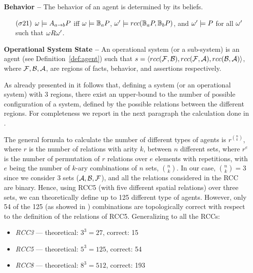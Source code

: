 \begin{definition}{\bf Behavior -- }\label{def:behavior}
	The behavior of an agent is determined by its beliefs. 
	\begin{enumerate}[noitemsep]
		\item[$(\sigma21)$] $\omega\models A_{a\rightarrow b}P$ iff
			$\omega\models\mathbb{B}_{a}{P}$, 
			$\omega'\models rcc(\mathbb{B}_{a}{P},\mathbb{B}_{b}{P})$, and $\omega'\models P$ for all
			$\omega'$ such that $\omega R\omega'$.
	\end{enumerate}
\end{definition}

\begin{definition}{\bf Operational System State --}\label{def:system}
	An operational system (or a sub-system) is an agent (see Definition~\ref{def:agent})
	such that
	$s=\langle rcc(\mathcal{F},\mathcal{B}),rcc(\mathcal{F},\mathcal{A}),rcc(\mathcal{B},\mathcal{A})\rangle$,
	where $\mathcal{F},\mathcal{B},\mathcal{A}$, are regions of facts, behavior, and assertions respectively.
\end{definition}

As already presented in \autocite{Santaca2016abf} it follows that, defining
a system (or an operational system) with 3 regions, there exist
an upper-bound to the number of possible configuration of a system, defined by
the possible relations between the different regions.
For completeness we report in the next paragraph 
the calculation done in \autocite{Santaca2016abf}.

The general formula to calculate the number of different types of agents is
$r^{\binom{n}{k}}$, where $r$ is the number of relations with arity $k$,
between $n$ different sets, where $r^e$ is the number of permutation of $r$
relations over $e$ elements with repetitions, with $e$ being the number of
$k$-ary combinations of $n$ sets, $\binom{n}{k}$.
In our case, $\binom{n}{k}=3$ since we consider $3$ sets
($\mathcal{A},\mathcal{B},\mathcal{F}$), and all the relations
considered in the RCC are binary.  Hence, using RCC5 (with five different
spatial relations) over three sets, we can theoretically define up to 125
different type of agents. However, only 54 of the 125 (as showed in
\cite{improvingRCC}) combinations are topologically correct with respect to
the definition of the relations of RCC5. Generalizing to all the RCCs:

\begin{itemize}%
\item \emph{RCC3} --- theoretical: $3^3=27$,  correct: 15 
\item \emph{RCC5} --- theoretical: $5^3=125$, correct: 54
\item \emph{RCC8} --- theoretical: $8^3=512$, correct: 193
\end{itemize}

